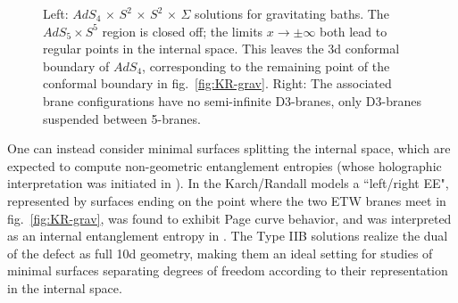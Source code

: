 \documentclass[aps,prd,11pt,notitlepage,longbibliography,nofootinbib,tightenlines,preprintnumbers]{revtex4-1}
\begin{document}
\begin{figure}
	
	\caption{
		Left: $AdS_4\,{\times}\, S^2\,{\times}\, S^2\,{\times}\,\Sigma$ solutions for gravitating baths. The $AdS_5\times S^5$ region is closed off; the limits $x\rightarrow \pm\infty$ both lead to regular points in the internal space.
		This leaves the 3d conformal boundary of $AdS_4$, corresponding to the remaining point of the conformal boundary in fig.~\ref{fig:KR-grav}.
		Right: The associated brane configurations have no semi-infinite D3-branes, only D3-branes suspended between 5-branes.
		\label{fig:AdS4-sol-grav}}
\end{figure}

One can instead consider minimal surfaces splitting the internal space, which are expected to compute non-geometric entanglement entropies (whose holographic interpretation was initiated in \cite{Mollabashi:2014qfa,Karch:2014pma}).
%
In the Karch/Randall models a ``left/right EE", represented by surfaces ending on the point where the two ETW branes meet in fig.~\ref{fig:KR-grav}, was found to exhibit Page curve behavior, and was interpreted as an internal entanglement entropy in \cite{Geng:2020fxl}.
%
The Type IIB solutions realize the dual of the defect as full 10d geometry, making them an ideal setting for studies of minimal surfaces separating degrees of freedom according to their representation in the internal space.
\end{document}
